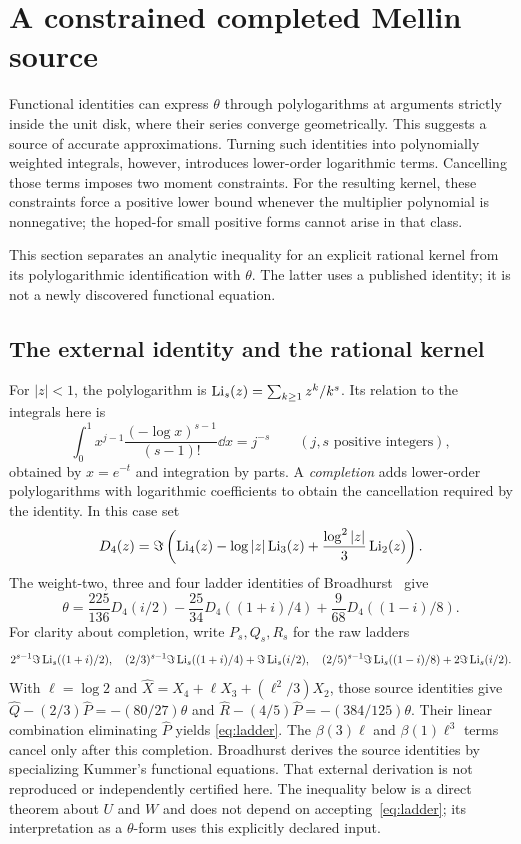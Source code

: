 \section{A constrained completed Mellin source}\label{sec:mellin}
Functional identities can express $\theta$ through polylogarithms at
arguments strictly inside the unit disk, where their series converge
geometrically. This suggests a source of accurate approximations.
Turning such identities into polynomially weighted integrals, however,
introduces lower-order logarithmic terms. Cancelling those terms imposes
two moment constraints. For the resulting kernel, these constraints
force a positive lower bound whenever the multiplier polynomial is
nonnegative; the hoped-for small positive forms cannot arise in that class.

This section separates an analytic inequality for an explicit rational
kernel from its polylogarithmic identification with $\theta$. The latter
uses a published identity; it is not a newly discovered functional
equation.

\subsection{The external identity and the rational kernel}
For $|z|<1$, the polylogarithm is
$\operatorname{Li}_s(z)=\sum_{k\geq1}z^k/k^s$. Its relation to the integrals here is
\[
 \int_0^1 x^{j-1}\frac{(-\log x)^{s-1}}{(s-1)!}\dd x=j^{-s}
 \qquad(j,s\text{ positive integers}),
\]
obtained by $x=e^{-t}$ and integration by parts. A \emph{completion}
adds lower-order polylogarithms with logarithmic coefficients to obtain
the cancellation required by the identity. In this case set
\[
 D_4(z)=\Im\left(\operatorname{Li}_4(z)-\log|z|\operatorname{Li}_3(z)
                         +\frac{\log^2|z|}{3}\operatorname{Li}_2(z)\right).
\]
The weight-two, three and four ladder identities of
Broadhurst~\cite[equations (39)--(46), (54)--(55)]{Broadhurst} give
\begin{equation}\label{eq:ladder}
 \theta=\frac{225}{136}D_4(i/2)
       -\frac{25}{34}D_4((1+i)/4)
       +\frac9{68}D_4((1-i)/8).
\end{equation}
For clarity about completion, write $P_s,Q_s,R_s$ for the raw ladders
\[
 2^{s-1}\Im\operatorname{Li}_s((1+i)/2),\quad
 (2/3)^{s-1}\Im\operatorname{Li}_s((1+i)/4)+\Im\operatorname{Li}_s(i/2),\quad
 (2/5)^{s-1}\Im\operatorname{Li}_s((1-i)/8)+2\Im\operatorname{Li}_s(i/2).
\]
With $\ell=\log2$ and
$\widehat X=X_4+\ell X_3+(\ell^2/3)X_2$, those source identities
give
$\widehat Q-(2/3)\widehat P=-(80/27)\theta$ and
$\widehat R-(4/5)\widehat P=-(384/125)\theta$.
Their linear combination eliminating $\widehat P$ yields
\eqref{eq:ladder}. The $\beta(3)\ell$ and $\beta(1)\ell^3$ terms
cancel only after this completion. Broadhurst derives the source
identities by specializing Kummer's functional equations. That external
derivation is not reproduced or independently certified here. The
inequality below is a direct theorem about $U$ and $W$ and does not
depend on accepting~\eqref{eq:ladder}; its interpretation as a
$\theta$-form uses this explicitly declared input.

